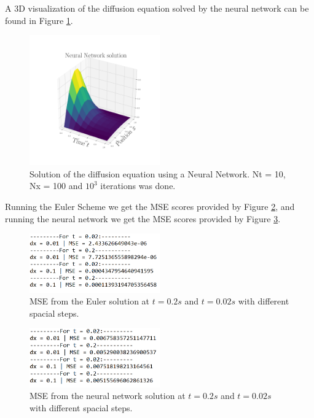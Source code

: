 \documentclass[a4paper,11pt,twocolumn]{article}
\begin{document}
A 3D visualization of the diffusion equation solved by the neural network can be found in Figure \ref{3dnn}.

\begin{figure}[h]
	\centering 
	\includegraphics[width=0.5\textwidth]{figures/dnn}
	\caption{Solution of the diffusion equation using a Neural Network. Nt = 10, Nx = 100 and $10^3$ iterations was done. }
	\label{3dnn}
\end{figure}

Running the Euler Scheme we get the MSE scores provided by Figure \ref{eulermse}, and running the neural network we get the MSE scores provided by Figure \ref{nnmse}.

\begin{figure}[h]
	\centering 
	\includegraphics[width=0.5\textwidth]{figures/euler_mse}
	\caption{MSE from the Euler solution at $t = 0.2s$ and $t = 0.02s$ with different spacial steps.}
	\label{eulermse}
\end{figure}

\begin{figure}[h]
	\centering 
	\includegraphics[width=0.5\textwidth]{figures/nnn_mse}
	\caption{MSE from the neural network solution at $t = 0.2s$ and $t = 0.02s$ with different spacial steps.}
	\label{nnmse}
\end{figure}
\end{document}
